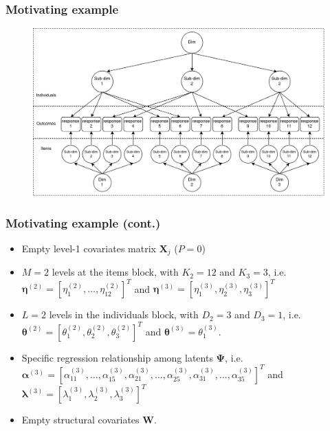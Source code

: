 \documentclass[arial,12pt,xcolor=dvipsnames]{beamer}
\begin{document}
%
\begin{frame}
	\frametitle{Motivating example}
	\begin{figure}[h]
		\centering
		\includegraphics[width=1\textwidth]{instrument_design}
		\label{fig:design}
	\end{figure}
\end{frame}
%
\begin{frame}
	\frametitle{Motivating example (cont.)}
	\begin{itemize}
		\item Empty level-1 covariates matrix $\mathbf{X}_{j}$ ($P=0$)
		\item $M=2$ levels at the items block, with $K_{2}=12$ and $K_{3}=3$, i.e. $\pmb{\eta}^{(2)} = [ \eta_{1}^{(2)}, \dots, \eta_{12}^{(2)} ]^{T}$ and $\pmb{\eta}^{(3)} = [ \eta_{1}^{(3)}, \eta_{2}^{(3)}, \eta_{3}^{(3)} ]^{T}$
		\item $L=2$ levels in the individuals block, with $D_{2}=3$ and $D_{3}=1$, i.e. $\pmb{\theta}^{(2)} = [ \theta_{1}^{(2)}, \theta_{2}^{(2)}, \theta_{3}^{(2)} ]^{T}$ and $\pmb{\theta}^{(3)} = \theta_{1}^{(3)}$.
		\item Specific regression relationship among latents $\pmb{\Psi}$, i.e.
		$ \pmb{\alpha}^{(3)} = [ \alpha_{11}^{(3)}, \dots, \alpha_{15}^{(3)}, \alpha_{21}^{(3)}, \dots, \alpha_{25}^{(3)}, \alpha_{31}^{(3)}, \dots, \alpha_{35}^{(3)} ]^{T} $ and  $ \pmb{\lambda}^{(3)} = [ \lambda_{1}^{(3)}, \lambda_{2}^{(3)}, \lambda_{3}^{(3)} ]^{T}$ 
		\item Empty structural covariates $\mathbf{W}$.
	\end{itemize}
\end{frame}
%
%
\end{document}
